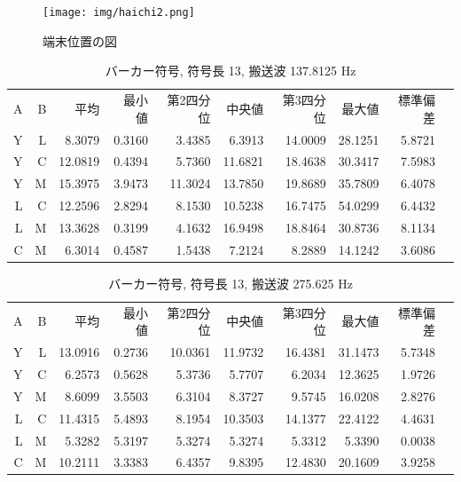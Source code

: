\begin{figure}[p]
  \centering
  \texttt{[image: img/haichi2.png]}
  \caption{端末位置の図}\label{fig:haichi2}
\end{figure}



\clearpage



\begin{table}[p]\centering
  \caption{バーカー符号, 符号長 13, 搬送波 137.8125 Hz}
  \label{tab:hikaku1}
  \begin{tabular}{rrrrrrrrrr}
    \hline
     A & B & 平均 & 最小値 & 第2四分位 & 中央値 & 第3四分位 & 最大値 & 標準偏差 \\
     Y & L & 8.3079 & 0.3160 & 3.4385 & 6.3913 & 14.0009 & 28.1251 & 5.8721 \\
     Y & C & 12.0819 & 0.4394 & 5.7360 & 11.6821 & 18.4638 & 30.3417 & 7.5983 \\
     Y & M & 15.3975 & 3.9473 & 11.3024 & 13.7850 & 19.8689 & 35.7809 & 6.4078 \\
     L & C & 12.2596 & 2.8294 & 8.1530 & 10.5238 & 16.7475 & 54.0299 & 6.4432 \\
     L & M & 13.3628 & 0.3199 & 4.1632 & 16.9498 & 18.8464 & 30.8736 & 8.1134 \\
     C & M & 6.3014 & 0.4587 & 1.5438 & 7.2124 & 8.2889 & 14.1242 & 3.6086 \\
    \hline
  \end{tabular}
\end{table}

\begin{table}[p]\centering
  \caption{バーカー符号, 符号長 13, 搬送波 275.625 Hz}
  \label{tab:hikaku2}
  \begin{tabular}{rrrrrrrrrr}
    \hline
     A & B & 平均 & 最小値 & 第2四分位 & 中央値 & 第3四分位 & 最大値 & 標準偏差 \\
     Y & L & 13.0916 & 0.2736 & 10.0361 & 11.9732 & 16.4381 & 31.1473 & 5.7348 \\
     Y & C & 6.2573 & 0.5628 & 5.3736 & 5.7707 & 6.2034 & 12.3625 & 1.9726 \\
     Y & M & 8.6099 & 3.5503 & 6.3104 & 8.3727 & 9.5745 & 16.0208 & 2.8276 \\
     L & C & 11.4315 & 5.4893 & 8.1954 & 10.3503 & 14.1377 & 22.4122 & 4.4631 \\
     L & M & 5.3282 & 5.3197 & 5.3274 & 5.3274 & 5.3312 & 5.3390 & 0.0038 \\
     C & M & 10.2111 & 3.3383 & 6.4357 & 9.8395 & 12.4830 & 20.1609 & 3.9258 \\
    \hline
  \end{tabular}
\end{table}

